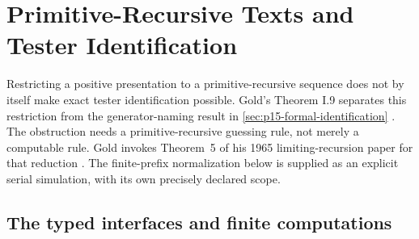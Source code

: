 \chapter{Primitive-Recursive Texts and Tester Identification}
\label{sec:p15-pr-learning-obstructions}

Restricting a positive presentation to a primitive-recursive sequence
does not by itself make exact tester identification possible.
Gold's Theorem I.9 separates this restriction from the generator-naming
result in \cref{sec:p15-formal-identification}
\cite[pp.\ 471--473]{Gold1967IdentificationFLT}.
The obstruction needs a primitive-recursive guessing rule, not merely
a computable rule. Gold invokes Theorem~5 of his 1965 limiting-recursion
paper for that reduction \cite{Gold1965LimitingRecursionPR}.
The finite-prefix normalization below is supplied as an explicit
serial simulation, with its own precisely declared scope.

\section{The typed interfaces and finite computations}
\label{sec:p15-pr-learning-interfaces}

